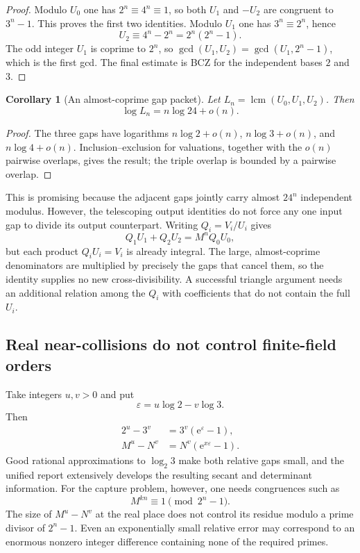 \documentclass[11pt,oneside]{article}
\newtheorem{corollary}[theorem]{Corollary}
\theoremstyle{definition}
\theoremstyle{remark}
\newcommand{\ee}{\mathrm e}
\begin{document}
\begin{proof}
Modulo $U_0$ one has $2^n\equiv4^n\equiv1$, so both $U_1$ and $-U_2$ are congruent to
$3^n-1$.  This proves the first two identities.  Modulo $U_1$ one has
$3^n\equiv2^n$, hence
\[
 U_2\equiv4^n-2^n=2^n(2^n-1).
\]
The odd integer $U_1$ is coprime to $2^n$, so
$\gcd(U_1,U_2)=\gcd(U_1,2^n-1)$, which is the first gcd.  The final estimate is BCZ for the
independent bases $2$ and $3$.
\end{proof}

\begin{corollary}[An almost-coprime gap packet]
\label{cor:triangle-lcm}
Let $L_n=\operatorname{lcm}(U_0,U_1,U_2)$.  Then
\[
 \log L_n=n\log24+o(n).
\]
\end{corollary}

\begin{proof}
The three gaps have logarithms $n\log2+o(n)$, $n\log3+o(n)$, and
$n\log4+o(n)$.  Inclusion--exclusion for valuations, together with the $o(n)$ pairwise
overlaps, gives the result; the triple overlap is bounded by a pairwise overlap.
\end{proof}

This is promising because the adjacent gaps jointly carry almost $24^n$ independent modulus.
However, the telescoping output identities do not force any one input gap to divide its
output counterpart.  Writing $Q_i=V_i/U_i$ gives
\[
 Q_1U_1+Q_2U_2=M^nQ_0U_0,
\]
but each product $Q_iU_i=V_i$ is already integral.  The large, almost-coprime denominators
are multiplied by precisely the gaps that cancel them, so the identity supplies no new
cross-divisibility.  A successful triangle argument needs an additional relation among the
$Q_i$ with coefficients that do not contain the full $U_i$.

\subsection{Real near-collisions do not control finite-field orders}

Take integers $u,v>0$ and put
\[
 \varepsilon=u\log2-v\log3.
\]
Then
\begin{align*}
 2^u-3^v&=3^v(\ee^{\varepsilon}-1),\\
 M^u-N^v&=N^v(\ee^{x\varepsilon}-1).
\end{align*}
Good rational approximations to $\log_2 3$ make both relative gaps small, and the unified
report extensively develops the resulting secant and determinant information.  For the
capture problem, however, one needs congruences such as
\[
 M^{kn}\equiv1\pmod{2^n-1}.
\]
The size of $M^u-N^v$ at the real place does not control its residue modulo a prime divisor of
$2^n-1$.  Even an exponentially small relative error may correspond to an enormous nonzero
integer difference containing none of the required primes.
\end{document}
